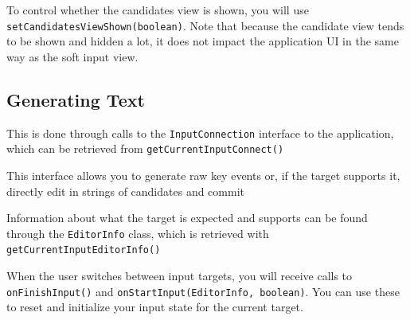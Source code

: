 \documentclass[11pt, a4paper]{book}
\begin{document}
To control whether the candidates view is shown, you will use
\verb|setCandidatesViewShown(boolean)|. Note that because the candidate view
tends to be shown and hidden a lot, it does not impact the application UI in the
same way as the soft input view.

\subsection{Generating Text}
This is done through calls to the \verb|InputConnection| interface to the
application, which can be retrieved from \verb|getCurrentInputConnect()|

This interface allows you to generate raw key events or, if the target supports
it, directly edit in strings of candidates and commit

Information about what the target is expected and supports can be found through
the \verb|EditorInfo| class, which is retrieved with
\verb|getCurrentInputEditorInfo()|

When the user switches between input targets, you will receive calls to
\verb|onFinishInput()| and \verb|onStartInput(EditorInfo, boolean)|. You can use
these to reset and initialize your input state for the current target.
\end{document}

